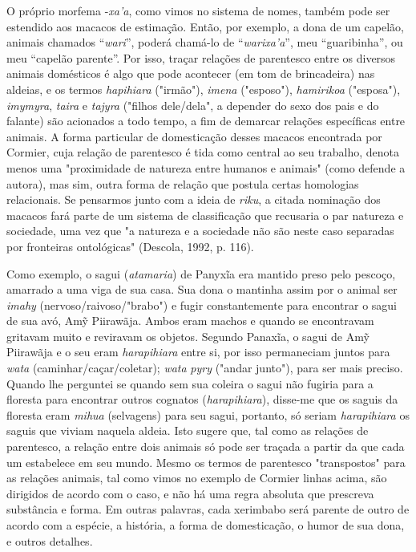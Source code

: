 O próprio morfema -\emph{xa'a}, como vimos no sistema de nomes, também
pode ser estendido aos macacos de estimação. Então, por exemplo, a dona
de um capelão, animais chamados ``\emph{wari}'', poderá chamá-lo de
``\emph{warixa'a}'', meu ``guaribinha'', ou meu ``capelão parente''. Por
isso, traçar relações de parentesco entre os diversos animais domésticos
é algo que pode acontecer (em tom de brincadeira) nas aldeias, e os
termos \emph{hapihiara} ("irmão"), \emph{imena} ("esposo"),
\emph{hamirikoa} ("esposa"), \emph{imymyra}, \emph{taira} e
\emph{tajyra} ("filhos dele/dela", a depender do sexo dos pais e do
falante) são acionados a todo tempo, a fim de demarcar relações
específicas entre animais. A forma particular de domesticação desses
macacos encontrada por Cormier, cuja relação de parentesco é tida como
central ao seu trabalho, denota menos uma "proximidade de natureza entre
humanos e animais" (como defende a autora), mas sim, outra forma de
relação que postula certas homologias relacionais. Se pensarmos junto
com a ideia de \emph{riku}, a citada nominação dos macacos fará parte de
um sistema de classificação que recusaria o par natureza e sociedade,
uma vez que "a natureza e a sociedade não são neste caso separadas por
fronteiras ontológicas" (Descola, 1992, p. 116).

Como exemplo, o sagui (\emph{atamaria}) de Panyxĩa era mantido preso
pelo pescoço, amarrado a uma viga de sua casa. Sua dona o mantinha assim
por o animal ser \emph{imahy} (nervoso/raivoso/"brabo") e fugir
constantemente para encontrar o sagui de sua avó, Amỹ Piirawãja. Ambos
eram machos e quando se encontravam gritavam muito e reviravam os
objetos. Segundo Panaxĩa, o sagui de Amỹ Piirawãja e o seu eram
\emph{harapihiara} entre si, por isso permaneciam juntos para
\emph{wata} (caminhar/caçar/coletar); \emph{wata} \emph{pyry} ("andar
junto"), para ser mais preciso. Quando lhe perguntei se quando sem sua
coleira o sagui não fugiria para a floresta para encontrar outros
cognatos (\emph{harapihiara}), disse-me que os saguis da floresta eram
\emph{mihua} (selvagens) para seu sagui, portanto, só seriam
\emph{harapihiara} os saguis que viviam naquela aldeia. Isto sugere que,
tal como as relações de parentesco, a relação entre dois animais só pode
ser traçada a partir da que cada um estabelece em seu mundo. Mesmo os
termos de parentesco "transpostos" para as relações animais, tal como
vimos no exemplo de Cormier linhas acima, são dirigidos de acordo com o
caso, e não há uma regra absoluta que prescreva substância e forma. Em
outras palavras, cada xerimbabo será parente de outro de acordo com a
espécie, a história, a forma de domesticação, o humor de sua dona, e
outros detalhes.

